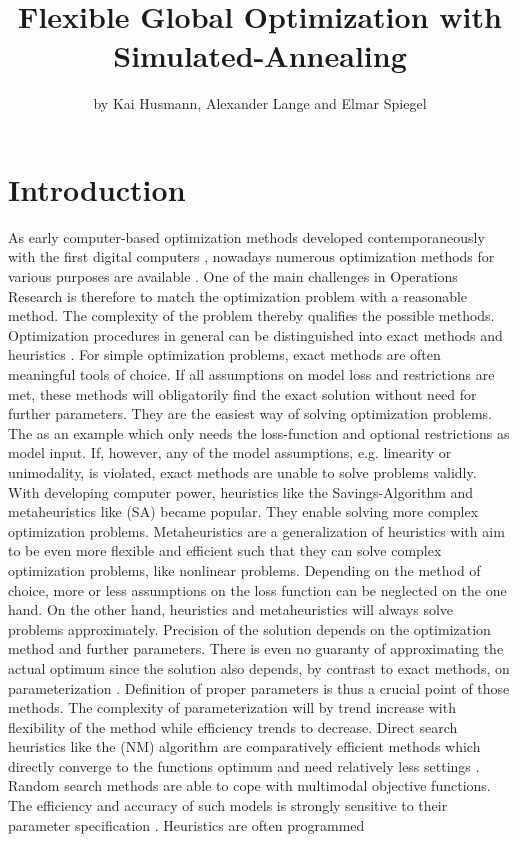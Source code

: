 \title{Flexible Global Optimization with Simulated-Annealing}
\author{by Kai Husmann, Alexander Lange and Elmar Spiegel}

\maketitle


\section{Introduction}
As early computer-based optimization methods developed contemporaneously with the first digital computers \citep{corana_1987}, nowadays numerous optimization methods for various purposes are available \citep{wegener_2005}. One of the main challenges in Operations Research is therefore to match the optimization problem with a reasonable method. The complexity of the problem thereby qualifies the possible methods. Optimization procedures in general can be distinguished into exact methods and heuristics \citep{kirkpatrick_1983}. For simple optimization problems, exact methods are often meaningful tools of choice. If all assumptions on model loss and restrictions are met, these methods will obligatorily find the exact solution without need for further parameters. They are the easiest way of solving optimization problems. The   \citep{dantzig_1959} as an example which only needs the loss-function and optional restrictions as model input. If, however, any of the model assumptions, e.g. linearity or unimodality, is violated, exact methods are unable to solve problems validly. With developing computer power, heuristics like the Savings-Algorithm \citep{clarke_1964} and metaheuristics like  (SA) \citep{kirkpatrick_1983} became popular. They enable solving more complex optimization problems. Metaheuristics are a generalization of heuristics with aim to be even more flexible and efficient \citep{blum_2003} such that they can solve complex optimization problems, like nonlinear problems. Depending on the method of choice, more or less assumptions on the loss function can be neglected on the one hand. On the other hand, heuristics and metaheuristics will always solve problems approximately. Precision of the solution depends on the optimization method and further parameters. There is even no guaranty of approximating the actual optimum since the solution also depends, by contrast to exact methods, on parameterization \citep{blum_2003}. Definition of proper parameters is thus a crucial point of those methods. The complexity of parameterization will by trend increase with flexibility of the method while efficiency trends to decrease. Direct search heuristics like the  (NM) algorithm are comparatively efficient methods which directly converge to the functions optimum and need relatively less settings \citep{geiger_1999}. Random search methods are able to cope with multimodal objective functions. The efficiency and accuracy of such models is strongly sensitive to their parameter specification \citep{corana_1987}. Heuristics are often programmed 